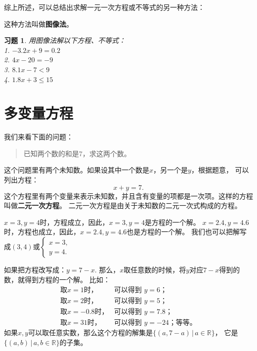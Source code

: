 \documentclass[12pt,UTF8]{ctexbook}
\newtheorem{xt}{习题}[section]
\begin{document}
综上所述，可以总结出求解一元一次方程或不等式的另一种方法：
\begin{center}
\end{center}

这种方法叫做\textbf{图像法}。

\begin{xt}
    用图像法解以下方程、不等式：\\
    1. $-3.2x + 9 = 0.2$\\
    2. $4x - 20 = -9$\\
    3. $8.1x -7 < 9$\\
    4. $1.8x + 3 \leqslant 15$
\end{xt}


\chapter{多变量方程}
我们来看下面的问题：
\begin{quote}
    已知两个数的和是$7$，求这两个数。
\end{quote}
这个问题里有两个未知数。如果设其中一个数是$x$，另一个是$y$，根据题意，
可以列出方程：
$$ x + y = 7.$$
这个方程里有两个变量来表示未知数，并且含有变量的项都是一次项。这样的方程叫做\textbf{二元一次方程}。
二元一次方程是由关于未知数的二元一次式构成的方程。

$x=3, y=4$时，方程成立，因此，$x=3, y=4$是方程的一个解。
$x=2.4, y=4.6$时，方程也成立，因此，$x=2.4, y=4.6$也是方程的一个解。
我们也可以把解写成$(3, 4)$或$ \left\{ \begin{array}{c}
    x = 3, \\
    y = 4.
\end{array}\right.$

如果把方程改写成：$ y = 7 - x.$
那么，$x$取任意数的时候，将$y$对应$7 - x$得到的数，就得到方程的一个解。
比如：
$$
\begin{array}{ll}
    \mbox{取}x = 1\mbox{时，} & \mbox{可以得到 }y = 6\mbox{；} \\
    \mbox{取}x = 2\mbox{时，} & \mbox{可以得到 }y = 5\mbox{；}  \\
    \mbox{取}x = -0.8\mbox{时，} & \mbox{可以得到 }y = 7.8\mbox{；}  \\
    \mbox{取}x = 31\mbox{时，} & \mbox{可以得到 }y = -24\mbox{；等等。} 
\end{array}
$$
如果$x,y$可以取任意实数，那么这个方程的解集是$\{(a, 7-a) \,|\, a \in \mathbb{R}\}$，
它是$\{(a, b) \,|\, a,b\in\mathbb{R}\}$的子集。
\end{document}
